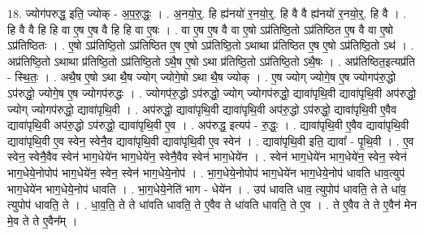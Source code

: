\documentclass[17pt]{extarticle}
\begin{document}
18. ज्योग॑परुद्ध॒ इति॒ ज्योक् - अ॒प॒रु॒द्धः॒ । . अ॒नयो॒र्॒. हि ह्य॑नयो॑ र॒नयो॒र्॒. हि वै वै ह्य॑नयो॑ र॒नयो॒र्॒. हि वै । . हि वै वै हि हि वा ए॒ष ए॒ष वै हि हि वा ए॒षः । . वा ए॒ष ए॒ष वै वा ए॒षो ऽप्र॑तिष्ठि॒तो ऽप्र॑तिष्ठित ए॒ष वै वा ए॒षो ऽप्र॑तिष्ठितः । . ए॒षो ऽप्र॑तिष्ठि॒तो ऽप्र॑तिष्ठित ए॒ष ए॒षो ऽप्र॑तिष्ठि॒तो ऽथाथा प्र॑तिष्ठित ए॒ष ए॒षो ऽप्र॑तिष्ठि॒तो ऽथ॑ । . अप्र॑तिष्ठि॒तो ऽथाथा प्र॑तिष्ठि॒तो ऽप्र॑तिष्ठि॒तो ऽथै॒ष ए॒षो ऽथा प्र॑तिष्ठि॒तो ऽप्र॑तिष्ठि॒तो ऽथै॒षः । . अप्र॑तिष्ठित॒इत्यप्र॑ति - स्थि॒तः॒ । . अथै॒ष ए॒षो ऽथा थै॒ष ज्योग् ज्योगे॒षो ऽथा थै॒ष ज्योक् । . ए॒ष ज्योग् ज्योगे॒ष ए॒ष ज्योगप॑रु॒द्धो ऽप॑रुद्धो॒ ज्योगे॒ष ए॒ष ज्योगप॑रुद्धः । . ज्योगप॑रु॒द्धो ऽप॑रुद्धो॒ ज्योग् ज्योगप॑रुद्धो॒ द्यावा॑पृथि॒वी द्यावा॑पृथि॒वी अप॑रुद्धो॒ ज्योग् ज्योगप॑रुद्धो॒ द्यावा॑पृथि॒वी । . अप॑रुद्धो॒ द्यावा॑पृथि॒वी द्यावा॑पृथि॒वी अप॑रु॒द्धो ऽप॑रुद्धो॒ द्यावा॑पृथि॒वी ए॒वैव द्यावा॑पृथि॒वी अप॑रु॒द्धो ऽप॑रुद्धो॒ द्यावा॑पृथि॒वी ए॒व । . अप॑रुद्ध॒ इत्यप॑ - रु॒द्धः॒ । . द्यावा॑पृथि॒वी ए॒वैव द्यावा॑पृथि॒वी द्यावा॑पृथि॒वी ए॒व स्वेन॒ स्वेनै॒व द्यावा॑पृथि॒वी द्यावा॑पृथि॒वी ए॒व स्वेन॑ । . द्यावा॑पृथि॒वी इति॒ द्यावा᳚ - पृ॒थि॒वी । . ए॒व स्वेन॒ स्वेनै॒वैव स्वेन॑ भाग॒धेये॑न भाग॒धेये॑न॒ स्वेनै॒वैव स्वेन॑ भाग॒धेये॑न । . स्वेन॑ भाग॒धेये॑न भाग॒धेये॑न॒ स्वेन॒ स्वेन॑ भाग॒धेये॒नोपोप॑ भाग॒धेये॑न॒ स्वेन॒ स्वेन॑ भाग॒धेये॒नोप॑ । . भा॒ग॒धेये॒नोपोप॑ भाग॒धेये॑न भाग॒धेये॒नोप॑ धावति धाव॒त्युप॑ भाग॒धेये॑न भाग॒धेये॒नोप॑ धावति । . भा॒ग॒धेये॒नेति॑ भाग - धेये॑न । . उप॑ धावति धाव॒ त्युपोप॑ धावति॒ ते ते धा॑व॒ त्युपोप॑ धावति॒ ते । . धा॒व॒ति॒ ते ते धा॑वति धावति॒ ते ए॒वैव ते धा॑वति धावति॒ ते ए॒व । . ते ए॒वैव ते ते ए॒वैन॑ मेन मे॒व ते ते ए॒वैन᳚म् । \newline
\end{document}
